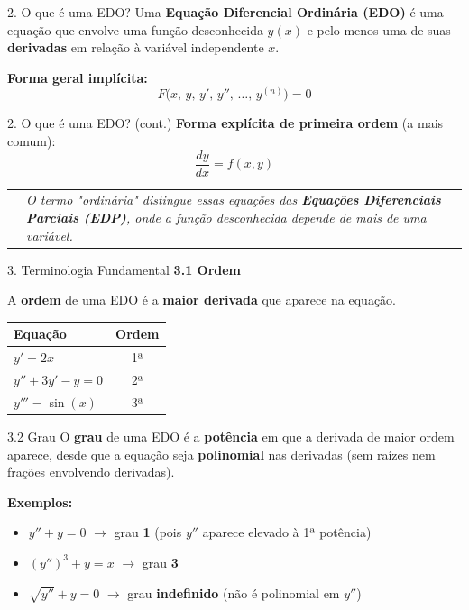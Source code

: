 \documentclass[11pt, aspectratio=169]{beamer}
\makeatletter
\newcommand{\notebox}[1]{%
  \begin{center}
  \begin{tabular}{@{}l@{\hspace{0.35cm}}p{0.82\textwidth}@{}}
    \textcolor{accent}{\rule{2pt}{0.55cm}} & \itshape\small\color{white!88!black} #1
  \end{tabular}
  \end{center}%
}
\makeatother
\begin{document}
\begin{frame}{2. O que é uma EDO?}
Uma \textbf{Equação Diferencial Ordinária (EDO)} é uma equação que envolve uma função desconhecida $y(x)$ e pelo menos uma de suas \textbf{derivadas} em relação à variável independente $x$.

\textbf{Forma geral implícita:}
\[
F\!\bigl(x,\, y,\, y',\, y'',\, \dots,\, y^{(n)}\bigr) = 0
\]
\end{frame}

\begin{frame}{2. O que é uma EDO? (cont.)}
\textbf{Forma explícita de primeira ordem} (a mais comum):
\[
\frac{dy}{dx} = f(x, y)
\]

\notebox{O termo "ordinária" distingue essas equações das \textbf{Equações Diferenciais Parciais (EDP)}, onde a função desconhecida depende de mais de uma variável.}
\end{frame}

\begin{frame}{3. Terminologia Fundamental}
\textbf{\large 3.1 Ordem}

\vspace{0.2cm}
A \textbf{ordem} de uma EDO é a \textbf{maior derivada} que aparece na equação.

\vspace{0.3cm}
\begin{center}
\small
\begin{tabular}{lc}
\textcolor{accent}{\textbf{Equação}} & \textcolor{accent}{\textbf{Ordem}} \\
\hline
$y' = 2x$ & 1ª \\
$y'' + 3y' - y = 0$ & 2ª \\
$y''' = \sin(x)$ & 3ª \\
\end{tabular}
\end{center}
\end{frame}

\begin{frame}{3.2 Grau}
O \textbf{grau} de uma EDO é a \textbf{potência} em que a derivada de maior ordem aparece, desde que a equação seja \textbf{polinomial} nas derivadas (sem raízes nem frações envolvendo derivadas).

\textbf{Exemplos:}
\begin{itemize}
  \item $y'' + y = 0$ $\rightarrow$ grau \textbf{1} (pois $y''$ aparece elevado à 1ª potência)
  \item $(y'')^3 + y = x$ $\rightarrow$ grau \textbf{3}
  \item $\sqrt{y''} + y = 0$ $\rightarrow$ grau \textbf{indefinido} (não é polinomial em $y''$)
\end{itemize}
\end{frame}
\end{document}
